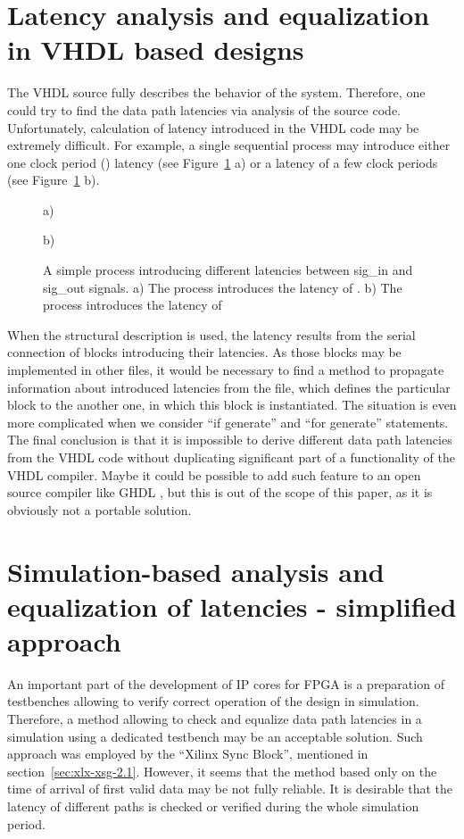 \documentclass[preprint,11pt]{elsarticle}
\newcommand{\wzcite}[1]{ \cite{#1}}
\begin{document}
 \section{Latency analysis and equalization in VHDL based designs}
 The VHDL source fully describes the behavior of the system. Therefore, one could
 try to find the data path latencies via analysis of the source code.
 Unfortunately, calculation of latency introduced in the VHDL code may be extremely difficult.
 For example, a single sequential process may introduce either one clock period
() latency (see Figure~\ref{fig:hdl-latencies-1} a) or a latency of a few clock
    periods (see Figure~\ref{fig:hdl-latencies-1} b).
\begin{figure}
 \begin{minipage}{\linewidth}
 {
\scriptsize
\begin{multicols}{2}
	\small
    a)\\
	\scriptsize
	
	\vfill
	\columnbreak
\small
    b)\\
	\scriptsize
	
 \end{multicols}
 }
 \end{minipage}
 \vspace{3mm}
 \caption{\label{fig:hdl-latencies-1}
 A simple process introducing different latencies between sig\_in and sig\_out signals. 
 a) The process introduces the latency of . b) The process introduces the latency of   
 }
\end{figure}    
When the structural description is used, the latency results from the serial connection
of blocks introducing their latencies. As those blocks may be implemented in other files,
it would be necessary to find a method to propagate information about introduced latencies
from the file, which defines the particular block to the another one, in which this block
is instantiated. 
The situation is even more complicated when we consider ``if generate'' and ``for generate'' 
statements.
The final conclusion is that it is impossible to derive different data path latencies
from the VHDL code without duplicating significant part of a functionality of the VHDL 
compiler. Maybe it could be possible to add such feature to an open source compiler
like GHDL\wzcite{url-ghdl}, but this is out of the scope of this paper, as it is obviously not
a portable solution.

\section{Simulation-based analysis and equalization of latencies - simplified approach}
An important part of the development of IP cores for FPGA is a preparation of 
testbenches allowing to verify correct operation of the design in simulation.
Therefore, a method allowing to check and equalize data path latencies in a simulation using
a dedicated testbench may be an acceptable solution.
Such approach was employed by the ``Xilinx Sync Block'', mentioned in section~\ref{sec:xlx-xsg-2.1}.
However, it seems that the method based only on the time of arrival of first valid data 
may be not fully reliable. It is desirable that the latency of different paths is checked or 
verified during the whole simulation period.
\end{document}

